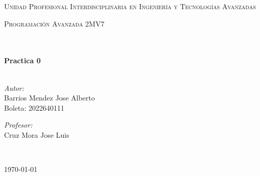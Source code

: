 \documentclass[10pt]{article}
\begin{document}
\begin{center}
\textsc{\LARGE Unidad Profesional Interdisciplinaria en Ingenier\'ia y				%
Tecnolog\'ias Avanzadas}\\[1.5cm]													%

\begin{minipage}{0.9\textwidth} 
\begin{center}																					%
\textsc{\LARGE Programación Avanzada 2MV7}
\end{center}
\end{minipage}\\[0.5cm]
 			\vspace*{1cm}																		%
\HRule \\[0.4cm]																	%
{ \huge \bfseries Practica 0}\\[0.4cm]	%
\HRule \\[1.5cm]																	%
\begin{minipage}{0.46\textwidth}													%
\begin{flushleft} \large															%
\emph{Autor:}\\	
Barrios Mendez Jose Alberto\\
Boleta: 2022640111


\end{flushleft}																		%
\end{minipage}		
\begin{minipage}{0.52\textwidth}		
\vspace{-0.6cm}											%
\begin{flushright} \large															%
\emph{Profesor:} \\																	%
Cruz Mora Jose Luis\\
\end{flushright}																	%
\end{minipage}	
\vspace*{1cm}
 	
 		\\																		%
\vspace{2cm} 																				
\begin{center}																					
{\large \today}																	%
 			\end{center}												  						
\end{center}							 											
																					
\end{document}
